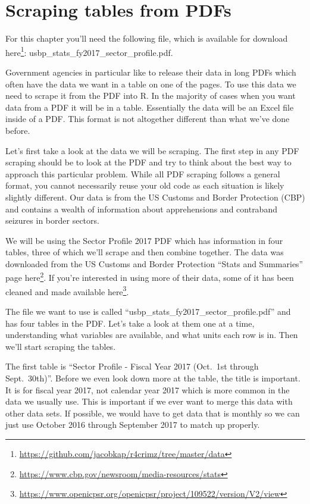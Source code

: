 \documentclass[
]{krantz}
\renewcommand{\href}[2]{#2\footnote{\url{#1}}}
\begin{document}
\hypertarget{scrape-table}{%
\chapter{Scraping tables from PDFs}\label{scrape-table}}

For this chapter you'll need the following file, which is
available for download
\href{https://github.com/jacobkap/r4crimz/tree/master/data}{here}:
usbp\_stats\_fy2017\_sector\_profile.pdf.

Government agencies in particular like to release their data
in long PDFs which often have the data we want in a table on
one of the pages. To use this data we need to scrape it from
the PDF into R. In the majority of cases when you want data
from a PDF it will be in a table. Essentially the data will
be an Excel file inside of a PDF. This format is not
altogether different than what we've done before.

Let's first take a look at the data we will be scraping. The
first step in any PDF scraping should be to look at the PDF
and try to think about the best way to approach this
particular problem. While all PDF scraping follows a general
format, you cannot necessarily reuse your old code as each
situation is likely slightly different. Our data is from the
US Customs and Border Protection (CBP) and contains a wealth
of information about apprehensions and contraband seizures
in border sectors.

We will be using the Sector Profile 2017 PDF which has
information in four tables, three of which we'll scrape and
then combine together. The data was downloaded from the US
Customs and Border Protection ``Stats and Summaries'' page
\href{https://www.cbp.gov/newsroom/media-resources/stats}{here}.
If you're interested in using more of their data, some of it
has been cleaned and made available
\href{https://www.openicpsr.org/openicpsr/project/109522/version/V2/view}{here}.

The file we want to use is called
``usbp\_stats\_fy2017\_sector\_profile.pdf'' and has four
tables in the PDF. Let's take a look at them one at a time,
understanding what variables are available, and what units
each row is in. Then we'll start scraping the tables.

The first table is ``Sector Profile - Fiscal Year 2017
(Oct.~1st through Sept.~30th)''. Before we even look down
more at the table, the title is important. It is for fiscal
year 2017, not calendar year 2017 which is more common in
the data we usually use. This is important if we ever want
to merge this data with other data sets. If possible, we
would have to get data that is monthly so we can just use
October 2016 through September 2017 to match up properly.
\end{document}
